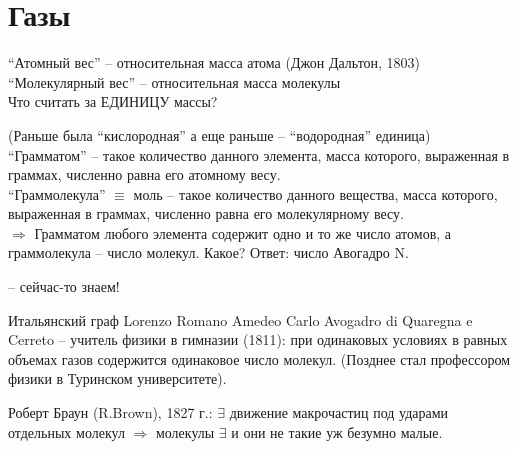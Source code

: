 \sf\Large


\section{Газы}

\noindent
``Атомный вес'' -- относительная масса атома (Джон Дальтон, 1803)\\
``Молекулярный вес'' -- относительная масса молекулы\\
Что считать за ЕДИНИЦУ массы?
\begin{center}
{}
\end{center}
(Раньше была ``кислородная'' а еще раньше -- ``водородная'' единица)\\
``Грамматом'' -- такое количество данного элемента, масса которого, вы\-ра\-жен\-ная в граммах, численно равна его атомному весу.\\
``Граммолекула'' $\equiv$ моль -- такое количество данного вещества, масса ко\-то\-ро\-го, выраженная в граммах, численно равна его молекулярному весу.\\
 $\Rightarrow$ Грамматом любого элемента содержит одно и то же число атомов, а граммолекула -- число молекул. Какое? Ответ: число Авогадро N.
\begin{center}
{} -- сейчас-то знаем!
\end{center}
Итальянский граф Lorenzo Romano Amedeo Carlo Avogadro di Quaregna e Cerreto -- учитель физики в гимназии (1811): при одинаковых условиях в равных объемах газов содержится одинаковое число молекул. (Позднее стал профессором физики в Туринском университете).

Роберт Браун (R.Brown), 1827 г.: $\exists$ движение макрочастиц под ударами отдельных молекул $\Rightarrow$ молекулы $\exists$ и они не такие уж безумно малые.

